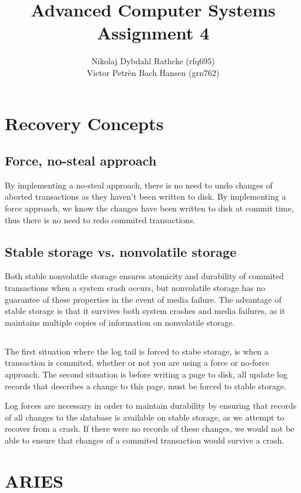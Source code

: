 \documentclass[a4paper]{article}
\author{Nikolaj Dybdahl Rathcke (rfq695) \\ Victor Petrèn Bach Hansen (grn762)}
\title{Advanced Computer Systems \\ Assignment 4}
\begin{document}
\maketitle

\section{Recovery Concepts}
\subsection{Force, no-steal approach}
By implementing a no-steal approach, there is no need to undo changes of aborted transactions as they haven't been written to disk. By implementing a force approach, we know the changes have been written to disk at commit time, thus there is no need to redo commited transactions.
\subsection{Stable storage vs. nonvolatile storage}
Both stable nonvolatile storage ensures atomicity and durability of commited transactions when a system crash occurs, but nonvolatile storage has no guarantee of these properties in the event of media failure. The advantage of stable storage is that it survives both system crashes and media failures, as it maintains multiple copies of information on nonvolatile storage.
\subsection{}
The first situation where the log tail is forced to stabe storage, is when a transaction is commited, whether or not you are using a force or no-force approach. The second situation is before writing a page to disk, all update log records that describes a change to this page, must be forced to stable storage.

Log forces are necessary in order to maintain durability by ensuring that records of all changes to the database is available on stable storage, as we attempt to recover from a crash. If there were no records of these changes, we would not be able to ensure that changes of a commited transaction would survive a crash.

\section{ARIES}
\end{document}
